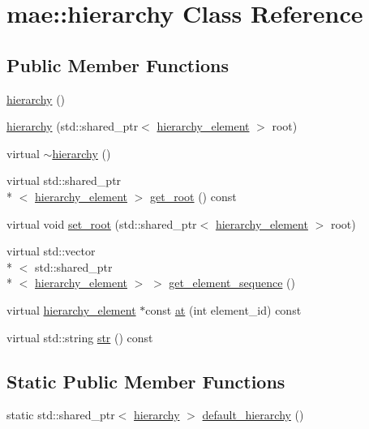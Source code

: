 \hypertarget{classmae_1_1hierarchy}{\section{mae\-:\-:hierarchy Class Reference}
\label{classmae_1_1hierarchy}
}
\subsection*{Public Member Functions}
\begin{DoxyCompactItemize}
\item 
\hyperlink{classmae_1_1hierarchy_ad8006ba53f5228fa32e5040eba48a2ba}{hierarchy} ()
\item 
\hyperlink{classmae_1_1hierarchy_a078873a827d93987db7b149a698144f7}{hierarchy} (std\-::shared\-\_\-ptr$<$ \hyperlink{classmae_1_1hierarchy__element}{hierarchy\-\_\-element} $>$ root)
\item 
virtual \hyperlink{classmae_1_1hierarchy_a24cca85994f8bac7c078f0f2b63f37cd}{$\sim$hierarchy} ()
\item 
virtual std\-::shared\-\_\-ptr\\*
$<$ \hyperlink{classmae_1_1hierarchy__element}{hierarchy\-\_\-element} $>$ \hyperlink{classmae_1_1hierarchy_a67f50abac7cdceff6b2d4a2e5db80e1c}{get\-\_\-root} () const 
\item 
virtual void \hyperlink{classmae_1_1hierarchy_ab4f151f5e91d7078d41e9b0d65ea88df}{set\-\_\-root} (std\-::shared\-\_\-ptr$<$ \hyperlink{classmae_1_1hierarchy__element}{hierarchy\-\_\-element} $>$ root)
\item 
virtual std\-::vector\\*
$<$ std\-::shared\-\_\-ptr\\*
$<$ \hyperlink{classmae_1_1hierarchy__element}{hierarchy\-\_\-element} $>$ $>$ \hyperlink{classmae_1_1hierarchy_a1f7df9e7e9d86e24a62359da3b8a72fe}{get\-\_\-element\-\_\-sequence} ()
\item 
virtual \hyperlink{classmae_1_1hierarchy__element}{hierarchy\-\_\-element} $\ast$const \hyperlink{classmae_1_1hierarchy_abc29a6cb37845624d40680f1c01ebd96}{at} (int element\-\_\-id) const 
\item 
virtual std\-::string \hyperlink{classmae_1_1hierarchy_a09756b507aa2fefb8e54f854333aa93d}{str} () const 
\end{DoxyCompactItemize}
\subsection*{Static Public Member Functions}
\begin{DoxyCompactItemize}
\item 
static std\-::shared\-\_\-ptr$<$ \hyperlink{classmae_1_1hierarchy}{hierarchy} $>$ \hyperlink{classmae_1_1hierarchy_a2d5a7b8af3c883a113bd3bf8756181e0}{default\-\_\-hierarchy} ()
\end{DoxyCompactItemize}
